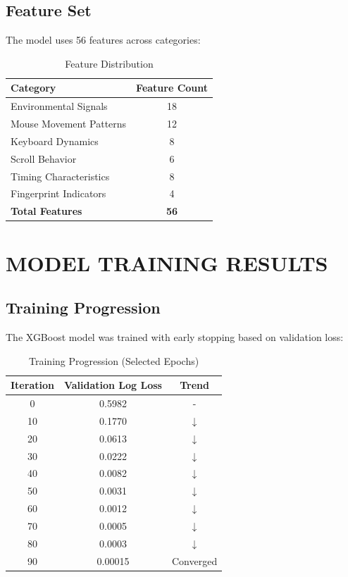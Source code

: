 \subsection{Feature Set}

The model uses 56 features across categories:

\begin{table}[H]
\centering
\caption{Feature Distribution}
\label{tab:feature_dist}
\begin{tabular}{|l|c|}
\hline
\textbf{Category} & \textbf{Feature Count} \\
\hline
Environmental Signals & 18 \\
\hline
Mouse Movement Patterns & 12 \\
\hline
Keyboard Dynamics & 8 \\
\hline
Scroll Behavior & 6 \\
\hline
Timing Characteristics & 8 \\
\hline
Fingerprint Indicators & 4 \\
\hline
\textbf{Total Features} & \textbf{56} \\
\hline
\end{tabular}
\end{table}

\section{MODEL TRAINING RESULTS}

\subsection{Training Progression}

The XGBoost model was trained with early stopping based on validation loss:

\begin{table}[H]
\centering
\caption{Training Progression (Selected Epochs)}
\label{tab:training_metrics}
\begin{tabular}{|c|c|c|}
\hline
\textbf{Iteration} & \textbf{Validation Log Loss} & \textbf{Trend} \\
\hline
0 & 0.5982 & - \\
\hline
10 & 0.1770 & $\downarrow$ \\
\hline
20 & 0.0613 & $\downarrow$ \\
\hline
30 & 0.0222 & $\downarrow$ \\
\hline
40 & 0.0082 & $\downarrow$ \\
\hline
50 & 0.0031 & $\downarrow$ \\
\hline
60 & 0.0012 & $\downarrow$ \\
\hline
70 & 0.0005 & $\downarrow$ \\
\hline
80 & 0.0003 & $\downarrow$ \\
\hline
90 & 0.00015 & Converged \\
\hline
\end{tabular}
\end{table}

